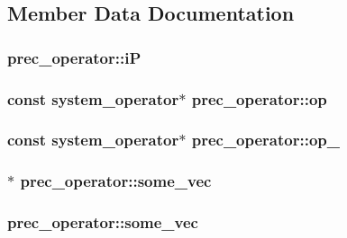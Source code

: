 \subsection{Member Data Documentation}
\hypertarget{structprec__operator_ae630f00099683269fd18fae92a48c48b}{
\subsubsection[{i\-P}]{ prec\-\_\-operator\-::i\-P}}\label{structprec__operator_ae630f00099683269fd18fae92a48c48b}
\hypertarget{structprec__operator_af1130a19572d81a4283cf942defc9e32}{
\subsubsection[{op}]{\setlength{\rightskip}{0pt plus 5cm}const {\bf system\-\_\-operator}$\ast$ prec\-\_\-operator\-::op}}\label{structprec__operator_af1130a19572d81a4283cf942defc9e32}
\hypertarget{structprec__operator_aca40061d71943ef2781bcfde64280dcf}{
\subsubsection[{op\-\_\-}]{\setlength{\rightskip}{0pt plus 5cm}const {\bf system\-\_\-operator}$\ast$ prec\-\_\-operator\-::op\-\_\-}}\label{structprec__operator_aca40061d71943ef2781bcfde64280dcf}
\hypertarget{structprec__operator_ab32cd5dd6334438c3971d5368067fa25}{
\subsubsection[{some\-\_\-vec}]{$\ast$ prec\-\_\-operator\-::some\-\_\-vec}}\label{structprec__operator_ab32cd5dd6334438c3971d5368067fa25}
\hypertarget{structprec__operator_ad54c0c92bf70fa19d1aa97cf92df5a76}{
\subsubsection[{some\-\_\-vec}]{ prec\-\_\-operator\-::some\-\_\-vec}}\label{structprec__operator_ad54c0c92bf70fa19d1aa97cf92df5a76}
